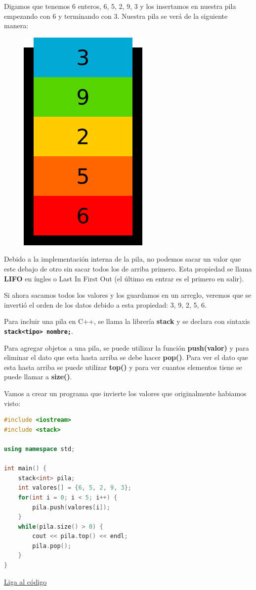 \documentclass{article}
\begin{document}
Digamos que tenemos 6 enteros, {6, 5, 2, 9, 3} y los insertamos en nuestra pila empezando con 6 y terminando con 3. Nuestra pila se verá de la siguiente manera:

\begin{figure}[H]
    \centering
    \includegraphics[width=0.1\paperwidth]{pila}
\end{figure}

Debido a la implementación interna de la pila, no podemos sacar un valor que este debajo de otro sin sacar todos los de arriba primero. Esta propiedad se llama \textbf{LIFO} en íngles o Last In First Out (el último en entrar es el primero en salir).

Si ahora sacamos todos los valores y los guardamos en un arreglo, veremos que se invertió el orden de los datos debido a esta propiedad: {3, 9, 2, 5, 6}.

Para incluir una pila en C++, se llama la librería \textbf{stack} y se declara con sintaxis \textbf{\lstinline{stack<tipo> nombre;}}.

Para agregar objetos a una pila, se puede utilizar la función \textbf{push(valor)} y para eliminar el dato que esta hasta arriba se debe hacer \textbf{pop()}. Para ver el dato que esta hasta arriba se puede utilizar \textbf{top()} y para ver cuantos elementos tiene se puede llamar a \textbf{size()}.

Vamos a crear un programa que invierte los valores que originalmente habiamos visto:

\begin{lstlisting}[language=C++, caption=Pilas]
#include <iostream>
#include <stack>

using namespace std;

int main() {
    stack<int> pila;
    int valores[] = {6, 5, 2, 9, 3};
    for(int i = 0; i < 5; i++) {
        pila.push(valores[i]);
    }
    while(pila.size() > 0) {
        cout << pila.top() << endl;
        pila.pop();
    }
}
\end{lstlisting}
\href{https://repl.it/@Jamesscn/Cargando-pilas}{Liga al código} \\
\end{document}
